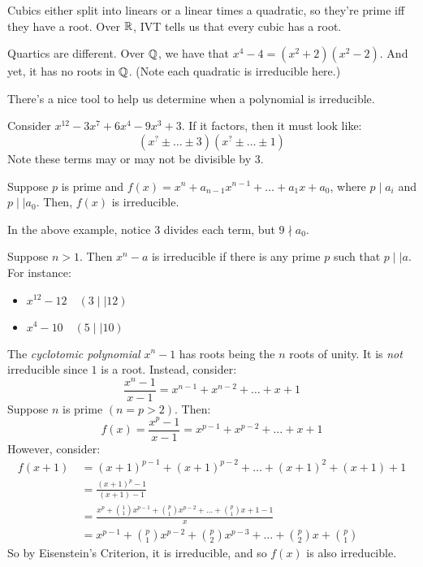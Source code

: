 Cubics either split into linears or a linear times a quadratic, so they're prime iff they have a
root. Over $ \mathbb{R} $, IVT tells us that every cubic has a root.

Quartics are different. Over $ \mathbb{Q} $, we have that $ x^{4}-4=(x^{2}+2)(x^{2}-2) $.
And yet, it has no roots in $ \mathbb{Q} $. (Note each quadratic is irreducible here.)

There's a nice tool to help us determine when a polynomial is irreducible.
\begin{xmp}[source=Primary Source Material]
    Consider $ x^{12}-3x^{7}+6x^{4}-9x^{3}+3 $. If it factors, then it must look like:
    \begin{equation*}
        (x^{?}\pm \dots \pm3)(x^{?}\pm \dots\pm1)
    \end{equation*}
    Note these terms may or may not be divisible by 3.
\end{xmp}

\begin{lm}[title=Eisenstein's Criterion]
    Suppose $ p $ is prime and $ f(x)=x^{n}+a_{n-1}x^{n-1}+\dots+a_{1}x+a_{0} $,
    where $ p \mid a_{i} $ and $ p \mid\mid a_{0} $. Then, $ f(x) $ is irreducible.
\end{lm}
In the above example, notice 3 divides each term, but $ 9 \nmid a_{0} $.

\begin{xmp}[source=Primary Source Material]
    Suppose $ n > 1 $. Then $ x^{n}-a $ is irreducible if there is any prime $ p $ such that
    $ p \mid\mid a $. For instance:
    \begin{itemize}
        \item $ x^{12}-12 \quad (3 \mid\mid 12) $
        \item $ x^{4}-10 \quad (5 \mid\mid 10) $
    \end{itemize}
\end{xmp}

The \textit{cyclotomic polynomial} $ x^{n}-1 $ has roots being the $ n $ roots of unity.
It is \textit{not} irreducible since $ 1 $ is a root. Instead, consider:
\begin{equation*}
    \frac{x^{n}-1}{x-1}= x^{n-1}+x^{n-2}+\dots+x+1
\end{equation*}
Suppose $ n $ is prime $ (n = p > 2) $. Then:
\begin{equation*}
    f(x)=\frac{x^{p}-1}{x-1} = x^{p-1}+x^{p-2}+\dots+x+1
\end{equation*}
However, consider:
\begin{align*}
    f(x+1) & \ = (x+1)^{p-1}+(x+1)^{p-2}+\dots+(x+1)^{2}+(x+1)+1 \\
           & \ = \frac{(x+1)^{p}-1}{(x+1)-1} \\
           & \ = \frac{x^{p}+\binom 1 1x^{p-1}+\binom p 1x^{p-2}+\dots+\binom p 1x+1-1}{x} \\
           & \ = x^{p-1}+\binom p 1x^{p-2}+\binom p 2x^{p-3}+\dots+\binom p 2x + \binom p 1
\end{align*}
So by Eisenstein's Criterion, it is irreducible, and so $ f(x) $ is also irreducible.

